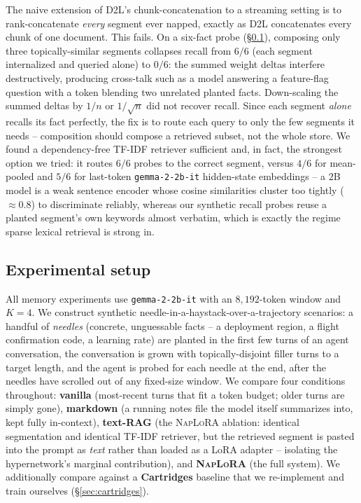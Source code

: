 \documentclass[11pt]{article}
\newcommand{\DTL}{D2L}
\newcommand{\naplora}{\textsc{NapLoRA}}
\newcommand{\mt}[1]{\texttt{\small #1}}
\begin{document}
The naive extension of \DTL{}'s chunk-concatenation to a streaming setting is to rank-concatenate \emph{every} segment ever napped, exactly as \DTL{} concatenates every chunk of one document. This fails. On a six-fact probe (\S\ref{sec:setup}), composing only three topically-similar segments collapses recall from $6/6$ (each segment internalized and queried alone) to $0/6$: the summed weight deltas interfere destructively, producing cross-talk such as a model answering a feature-flag question with a token blending two unrelated planted facts. Down-scaling the summed deltas by $1/n$ or $1/\sqrt n$ did not recover recall. Since each segment \emph{alone} recalls its fact perfectly, the fix is to route each query to only the few segments it needs -- composition should compose a retrieved subset, not the whole store. We found a dependency-free TF-IDF retriever sufficient and, in fact, the strongest option we tried: it routes $6/6$ probes to the correct segment, versus $4/6$ for mean-pooled and $5/6$ for last-token \mt{gemma-2-2b-it} hidden-state embeddings -- a $2$B model is a weak sentence encoder whose cosine similarities cluster too tightly ($\approx\!0.8$) to discriminate reliably, whereas our synthetic recall probes reuse a planted segment's own keywords almost verbatim, which is exactly the regime sparse lexical retrieval is strong in.

\subsection{Experimental setup}
\label{sec:setup}

All memory experiments use \mt{gemma-2-2b-it} with an $8{,}192$-token window and $K\!=\!4$. We construct synthetic needle-in-a-haystack-over-a-trajectory scenarios: a handful of \emph{needles} (concrete, unguessable facts -- a deployment region, a flight confirmation code, a learning rate) are planted in the first few turns of an agent conversation, the conversation is grown with topically-disjoint filler turns to a target length, and the agent is probed for each needle at the end, after the needles have scrolled out of any fixed-size window. We compare four conditions throughout: \textbf{vanilla} (most-recent turns that fit a token budget; older turns are simply gone), \textbf{markdown} (a running notes file the model itself summarizes into, kept fully in-context), \textbf{text-RAG} (the \naplora{} ablation: identical segmentation and identical TF-IDF retriever, but the retrieved segment is pasted into the prompt as \emph{text} rather than loaded as a LoRA adapter -- isolating the hypernetwork's marginal contribution), and \textbf{\naplora{}} (the full system). We additionally compare against a \textbf{Cartridges} \citep{eyuboglu2025cartridges} baseline that we re-implement and train ourselves (\S\ref{sec:cartridges}).
\end{document}
